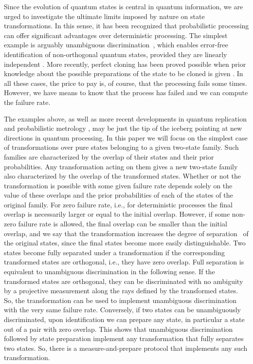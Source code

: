 \documentclass[aps,pra,twocolumn,showpacs]{revtex4-1}
\begin{document}
Since the evolution of quantum states is central in quantum information, we are urged to investigate the ultimate limits imposed by nature on state transformations. In this sense, it has been recognized that probabilistic processing can offer significant advantages over deterministic processing. The simplest example is arguably unambiguous discrimination~\cite{Ivanovic,Dieks,Peres,Jaeger&Shimony}, which enables error-free identification of non-orthogonal quantum states, provided they are linearly independent \cite{CheflesLinInd,Bergourev}. More recently, perfect cloning has been proved possible when prior knowledge about the possible preparations of the state to be cloned is given \cite{DuanGuo,chclo,us1}. In all these cases, the price to pay is, of course, that the processing fails some times. However, we have means to know that the process has failed and we can compute the failure rate.

The examples above, as well as more recent developments in quantum replication \cite{Chiribella} and probabilistic metrology \cite{Gendra}, may be just the tip of the iceberg pointing at new directions in quantum processing.  In this paper we will focus on the simplest case of transformations over pure states belonging to a given two-state family. Such families are characterized by the overlap of their states and their prior probabilities. Any transformation acting on them gives a new two-state family also characterized by the overlap of the transformed states. Whether or not the transformation is possible with some given failure rate depends solely on the value of these overlaps and the prior probabilities of each of the states of the original family.  For zero failure rate, i.e., for deterministic processes the final overlap is necessarily larger or equal to the initial overlap. However, if some non-zero failure rate is allowed, the final overlap can be smaller than the initial overlap, and we say that the transformation increases the degree of separation~\cite{Chefles+Barnett} of the original states, since the final states become more easily distinguishable. Two states become fully separated under a transformation if the corresponding transformed states are orthogonal,  i.e., they have zero overlap. Full separation is equivalent to unambiguous discrimination in the following sense. If the transformed states are orthogonal, they can be  discriminated with no ambiguity by a projective measurement along the rays defined by the transformed states. So, the transformation can be used to implement unambiguous discrimination with the very same failure rate. Conversely, if two states can be unambiguously discriminated, upon identification we can prepare any state, in particular a state out of a pair with zero overlap. This shows that unambiguous discrimination followed by state preparation implement any transformation that fully separates two states. So, there is a measure-and-prepare protocol that implements any such transformation.
\end{document}
